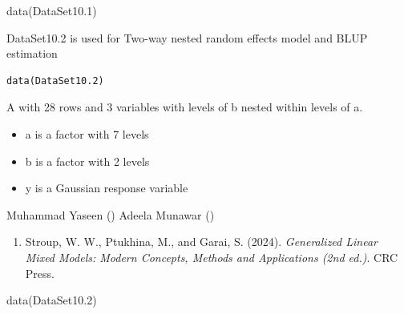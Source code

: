 \documentclass[a4paper]{book}
\begin{document}
%
\begin{Examples}
\begin{ExampleCode}
data(DataSet10.1)
\end{ExampleCode}
\end{Examples}
%
\begin{Description}
DataSet10.2 is used for Two-way nested random effects model and BLUP estimation
\end{Description}
%
\begin{Usage}
\begin{verbatim}
data(DataSet10.2)
\end{verbatim}
\end{Usage}
%
\begin{Format}
A  with 28 rows and 3 variables with levels of b nested within levels of a.
\end{Format}
%
\begin{Details}
\begin{itemize}

\item{} a  is a factor with 7 levels
\item{} b  is a factor with 2 levels
\item{} y  is a Gaussian response variable

\end{itemize}

\end{Details}
%
\begin{Author}
Muhammad Yaseen ()
Adeela Munawar ()
\end{Author}
%
\begin{References}
\begin{enumerate}

\item{} Stroup, W. W., Ptukhina, M., and Garai, S. (2024).
\emph{Generalized Linear Mixed Models: Modern Concepts, Methods and Applications (2nd ed.)}.
CRC Press.

\end{enumerate}

\end{References}
%
\begin{SeeAlso}
\end{SeeAlso}
%
\begin{Examples}
\begin{ExampleCode}
data(DataSet10.2)
\end{ExampleCode}
\end{Examples}
\end{document}
